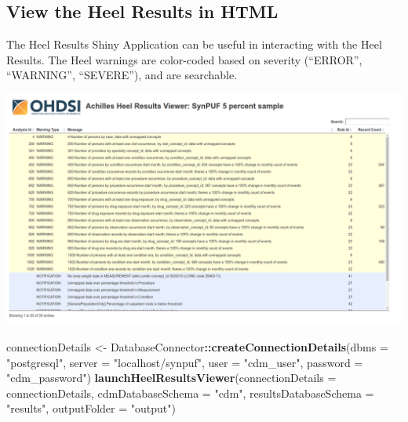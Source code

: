 \documentclass[]{article}
\newenvironment{Shaded}{\begin{snugshade}}{\end{snugshade}}
\newcommand{\KeywordTok}[1]{\textcolor[rgb]{0.13,0.29,0.53}{\textbf{#1}}}
\newcommand{\DataTypeTok}[1]{\textcolor[rgb]{0.13,0.29,0.53}{#1}}
\newcommand{\StringTok}[1]{\textcolor[rgb]{0.31,0.60,0.02}{#1}}
\newcommand{\OperatorTok}[1]{\textcolor[rgb]{0.81,0.36,0.00}{\textbf{#1}}}
\newcommand{\NormalTok}[1]{#1}
\begin{document}
\subsection{View the Heel Results in
HTML}\label{view-the-heel-results-in-html}

The Heel Results Shiny Application can be useful in interacting with the
Heel Results. The Heel warnings are color-coded based on severity
(``ERROR'', ``WARNING'', ``SEVERE''), and are searchable.

\includegraphics{../inst/doc/shinyHeel_screenshot.png}

\begin{Shaded}
\begin{Highlighting}[]
\NormalTok{connectionDetails <-}\StringTok{ }\NormalTok{DatabaseConnector}\OperatorTok{::}\KeywordTok{createConnectionDetails}\NormalTok{(}\DataTypeTok{dbms =} \StringTok{"postgresql"}\NormalTok{, }
                                                                \DataTypeTok{server =} \StringTok{"localhost/synpuf"}\NormalTok{, }
                                                                \DataTypeTok{user =} \StringTok{"cdm_user"}\NormalTok{, }
                                                                \DataTypeTok{password =} \StringTok{"cdm_password"}\NormalTok{)}
\KeywordTok{launchHeelResultsViewer}\NormalTok{(}\DataTypeTok{connectionDetails =}\NormalTok{ connectionDetails, }
                        \DataTypeTok{cdmDatabaseSchema =} \StringTok{"cdm"}\NormalTok{, }
                        \DataTypeTok{resultsDatabaseSchema =} \StringTok{"results"}\NormalTok{, }
                        \DataTypeTok{outputFolder =} \StringTok{"output"}\NormalTok{)}
\end{Highlighting}
\end{Shaded}
\end{document}
